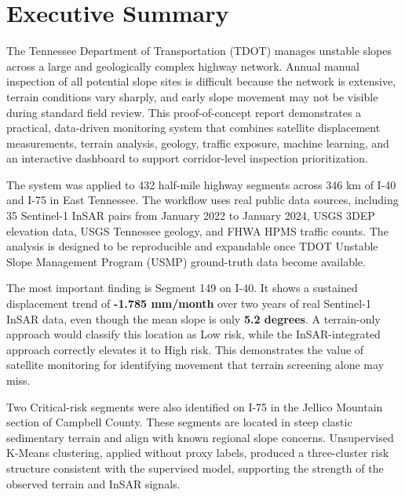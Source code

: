 \documentclass[11pt,letterpaper]{article}
\begin{document}
\section*{Executive Summary}

The Tennessee Department of Transportation (TDOT) manages unstable slopes across a large and geologically complex highway network. Annual manual inspection of all potential slope sites is difficult because the network is extensive, terrain conditions vary sharply, and early slope movement may not be visible during standard field review. This proof-of-concept report demonstrates a practical, data-driven monitoring system that combines satellite displacement measurements, terrain analysis, geology, traffic exposure, machine learning, and an interactive dashboard to support corridor-level inspection prioritization.

The system was applied to 432 half-mile highway segments across 346 km of I-40 and I-75 in East Tennessee. The workflow uses real public data sources, including 35 Sentinel-1 InSAR pairs from January 2022 to January 2024, USGS 3DEP elevation data, USGS Tennessee geology, and FHWA HPMS traffic counts. The analysis is designed to be reproducible and expandable once TDOT Unstable Slope Management Program (USMP) ground-truth data become available.

\begin{boxednote}
The most important finding is Segment 149 on I-40. It shows a sustained displacement trend of \textbf{-1.785 mm/month} over two years of real Sentinel-1 InSAR data, even though the mean slope is only \textbf{5.2 degrees}. A terrain-only approach would classify this location as Low risk, while the InSAR-integrated approach correctly elevates it to High risk. This demonstrates the value of satellite monitoring for identifying movement that terrain screening alone may miss.
\end{boxednote}

Two Critical-risk segments were also identified on I-75 in the Jellico Mountain section of Campbell County. These segments are located in steep clastic sedimentary terrain and align with known regional slope concerns. Unsupervised K-Means clustering, applied without proxy labels, produced a three-cluster risk structure consistent with the supervised model, supporting the strength of the observed terrain and InSAR signals.
\end{document}
